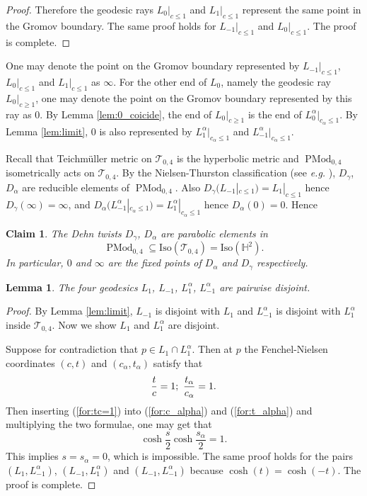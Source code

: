\documentclass[UTF8]{amsart}
\newtheorem{lemma}[theorem]{Lemma}
\newtheorem{claim}[theorem]{Claim}
\numberwithin{equation}{section}
\theoremstyle{definition}
\theoremstyle{example}
\theoremstyle{remark}
\DeclareMathOperator{\pmodo}{PMod}
\begin{document}
\begin{proof}
 Therefore the geodesic rays $L_{0}|_{c \le 1}$ and $L_{1}|_{c \le 1}$ represent the same point in the Gromov boundary. 
The same proof holds for $L_{-1}|_{c \le 1}$ and  $L_0|_{c \le 1}$. The proof is complete. 


\end{proof}

One may denote the point on the Gromov boundary represented by $L_{-1}|_{c \le 1}$, $L_0|_{c \le 1}$ and $L_1|_{c \le 1}$ as $\infty$. For the other end of $L_0$, namely the geodesic ray $L_0|_{c \ge 1}$, one may denote the point on the Gromov boundary represented by this ray as $0$. By Lemma \ref{lem:0_coicide}, the end of $L_0|_{c \ge 1}$ is the end of $L^{\alpha}_0|_{c_{\alpha} \le 1}$. By Lemma \ref{lem:limit}, $0$ is also represented by $L^{\alpha}_1|_{c_{\alpha} \le 1}$ and $L^{\alpha}_{-1}|_{c_{\alpha} \le 1}$. 

Recall that Teichm\"uller metric on $\mathcal{T}_{0,4}$ is the hyperbolic metric and $\pmodo_{0,4}$ isometrically acts on $\mathcal{T}_{0,4}$. By the Nielsen-Thurston classification (see \emph{e.g.} \cite{farb2011primer, fathi2021thurston}), $D_{\gamma}$, $D_{\alpha}$ are reducible elements of $\pmodo_{0,4}$. Also $D_{\gamma}(L_{-1}|_{ c\le 1}) = L_1|_{ c\le 1}$ hence $D_{\gamma}(\infty) = \infty$, and $D_{\alpha}(L_{-1}^{\alpha}|_{c_{\alpha} \le 1}) = L_1^{\alpha}|_{c_{\alpha} \le 1}$ hence $D_{\alpha}(0) = 0$. Hence
\begin{claim}
 The Dehn twists $D_{\gamma}$, $D_{\alpha}$ are parabolic elements in $$\pmodo_{0,4}\subseteq \mathrm{Iso}(\mathcal{T}_{0,4})=\mathrm{Iso}(\mathbb{H}^2).$$ In particular, $0$ and $\infty$ are the fixed points of $D_{\alpha}$ and $D_{\gamma}$ respectively. 
 \label{claim:parabolic}
\end{claim}

\begin{lemma}
 The four geodesics $L_{1}$, $L_{-1}$, $L_{1}^{\alpha}$, $L_{-1}^{\alpha}$ are pairwise disjoint. 
 \label{lem:disjoint}
\end{lemma}
\begin{proof}
 By Lemma \ref{lem:limit}, $L_{-1}$ is disjoint with $L_1$ and $L_{-1}^{\alpha}$ is disjoint with $L_1^{\alpha}$ inside $\mathcal{T}_{0,4}$. Now we show $L_1$ and $L_1^{\alpha}$ are disjoint. 

 Suppose for contradiction that $p \in L_1\cap L_1^{\alpha}$. Then at $p$ the Fenchel-Nielsen coordinates $(c, t)$ and $(c_{\alpha}, t_{\alpha})$ satisfy that
 \begin{equation}
  \frac{t}{c} = 1;\text{\,\,} \frac{t_{\alpha}}{c_{\alpha}} = 1.  
  \label{for:tc=1}
 \end{equation}
 Then inserting (\ref{for:tc=1}) into (\ref{for:c_alpha}) and (\ref{for:t_alpha}) and multiplying the two formulae, one may get that
 \[
  \cosh \frac{s}{2} \cosh \frac{s_{\alpha}}{2} =1.
 \]
 This implies $s= s_{\alpha} = 0$, which is impossible. 
 The same proof holds for the pairs $(L_1, L_{-1}^{\alpha})$, $(L_{-1}, L_{1}^{\alpha})$ and $(L_{-1}, L_{-1}^{\alpha})$ because $\cosh(t) = \cosh(-t)$. 
 The proof is complete. 
\end{proof}
\end{document}
